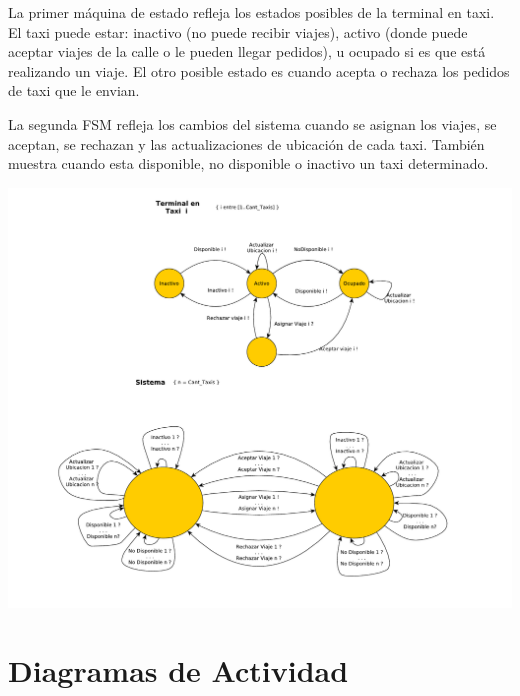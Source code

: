 \documentclass[a4paper]{article}
\begin{document}
La primer m\'aquina de estado refleja los estados posibles de la terminal en taxi. El taxi
puede estar: inactivo (no puede recibir viajes), activo (donde puede aceptar viajes de la calle o le pueden llegar pedidos), 
u ocupado si es que est\'a realizando un viaje. El otro posible estado es cuando acepta o rechaza los pedidos de taxi que le envian.

La segunda FSM refleja los cambios del sistema cuando se asignan los viajes, se aceptan, se rechazan y las actualizaciones de ubicaci\'on de cada
taxi. Tambi\'en muestra cuando esta disponible, no disponible o inactivo un taxi determinado.

\begin{center}
\includegraphics[scale=0.6]{diag_FSM.pdf}
\end{center}


\section{Diagramas de Actividad}
\end{document}
